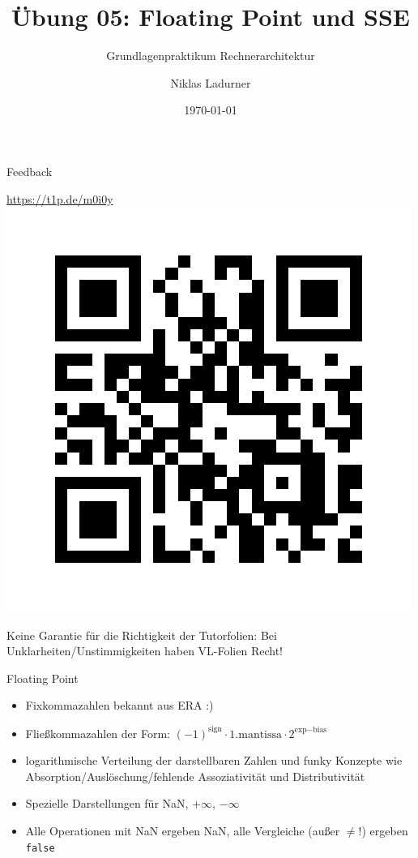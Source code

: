 \documentclass[
  german,            %
  aspectratio=169,    %
]{tumbeamer}
\title{Übung 05: Floating Point und SSE}
\subtitle{Grundlagenpraktikum Rechnerarchitektur}
\author{Niklas Ladurner}
\institute{\theChairName\\\theDepartmentName\\\theUniversityName}
\date[\today]{\today}
\begin{document}
\maketitle

\begin{frame}[c]{Feedback}{}
  \begin{center}
    \LARGE  \href{https://t1p.de/m0i0y}{https://t1p.de/m0i0y}\\
    \includegraphics[height=0.5\textheight]{feedback_qr.png}
  \end{center}
\end{frame}


\begin{frame}[c]{}{}
  \begin{center}
    \LARGE  Keine Garantie für die Richtigkeit der Tutorfolien: Bei Unklarheiten/Unstimmigkeiten
    haben VL-Folien Recht!
  \end{center}
\end{frame}

\begin{frame}[c, fragile]{Floating Point}{}
  \begin{itemize}
    \item Fixkommazahlen bekannt aus ERA :)
    \item Fließkommazahlen der Form: $(-1)^\text{sign}\cdot 1.\text{mantissa}\cdot 2^{\text{exp}-\text{bias}}$
    \item logarithmische Verteilung der darstellbaren Zahlen und funky Konzepte wie Absorption/Auslöschung/fehlende Assoziativität und Distributivität
    \item Spezielle Darstellungen für NaN, $+\infty$, $-\infty$
    \item Alle Operationen mit NaN ergeben NaN, alle Vergleiche (außer $\ne$!) ergeben \verb|false|
  \end{itemize}
\end{frame}
\end{document}

